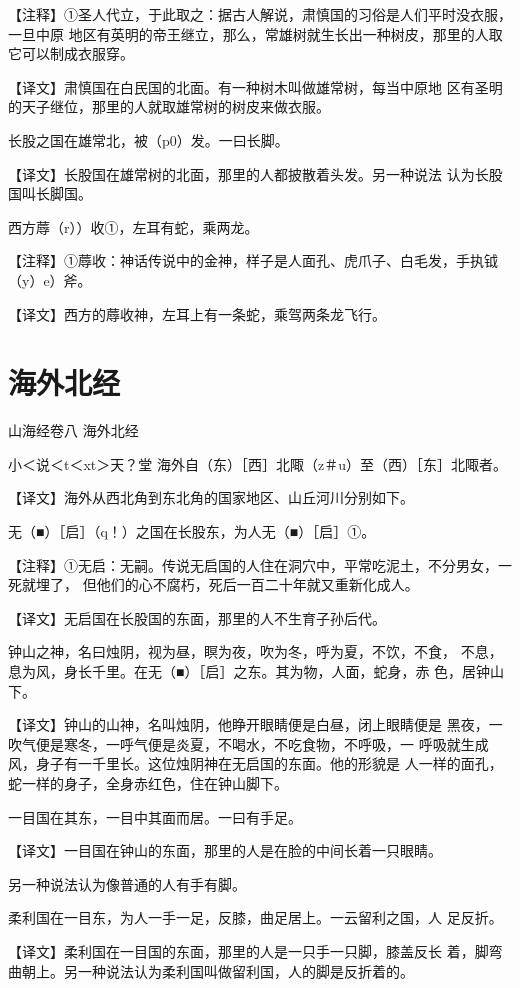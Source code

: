 \documentclass[a4paper,12pt,UTF8,twoside]{ctexbook}
\begin{document}
【注释】①圣人代立，于此取之：据古人解说，肃慎国的习俗是人们平时没衣服，一旦中原 地区有英明的帝王继立，那么，常雄树就生长出一种树皮，那里的人取它可以制成衣服穿。

【译文】肃慎国在白民国的北面。有一种树木叫做雄常树，每当中原地 区有圣明的天子继位，那里的人就取雄常树的树皮来做衣服。

长股之国在雄常北，被（p0）发。一曰长脚。

【译文】长股国在雄常树的北面，那里的人都披散着头发。另一种说法 认为长股国叫长脚国。

西方蓐（r））收①，左耳有蛇，乘两龙。

【注释】①蓐收：神话传说中的金神，样子是人面孔、虎爪子、白毛发，手执钺（y）e）斧。

【译文】西方的蓐收神，左耳上有一条蛇，乘驾两条龙飞行。

\chapter{海外北经}

山海经卷八 海外北经

小＜说＜t＜xt＞天？堂
海外自（东）［西］北陬（z＃u）至（西）［东］北陬者。

【译文】海外从西北角到东北角的国家地区、山丘河川分别如下。

无（■）［启］（q！）之国在长股东，为人无（■）［启］①。

【注释】①无启：无嗣。传说无启国的人住在洞穴中，平常吃泥土，不分男女，一死就埋了， 但他们的心不腐朽，死后一百二十年就又重新化成人。

【译文】无启国在长股国的东面，那里的人不生育子孙后代。

钟山之神，名曰烛阴，视为昼，瞑为夜，吹为冬，呼为夏，不饮，不食， 不息，息为风，身长千里。在无（■）［启］之东。其为物，人面，蛇身，赤 色，居钟山下。

【译文】钟山的山神，名叫烛阴，他睁开眼睛便是白昼，闭上眼睛便是 黑夜，一吹气便是寒冬，一呼气便是炎夏，不喝水，不吃食物，不呼吸，一 呼吸就生成风，身子有一千里长。这位烛阴神在无启国的东面。他的形貌是 人一样的面孔，蛇一样的身子，全身赤红色，住在钟山脚下。

一目国在其东，一目中其面而居。一曰有手足。

【译文】一目国在钟山的东面，那里的人是在脸的中间长着一只眼睛。

另一种说法认为像普通的人有手有脚。

柔利国在一目东，为人一手一足，反膝，曲足居上。一云留利之国，人 足反折。

【译文】柔利国在一目国的东面，那里的人是一只手一只脚，膝盖反长 着，脚弯曲朝上。另一种说法认为柔利国叫做留利国，人的脚是反折着的。
\end{document}
